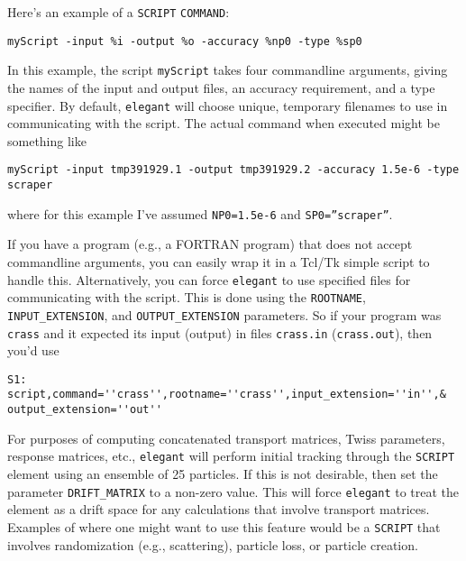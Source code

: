 Here's an example of a {\tt SCRIPT} {\tt COMMAND}:
\begin{flushleft}
\begin{verbatim}
myScript -input %i -output %o -accuracy %np0 -type %sp0
\end{verbatim}
\end{flushleft}
In this example, the script {\tt myScript} takes four commandline arguments, giving
the names of the input and output files, an accuracy requirement, and a type specifier.
By default, {\tt elegant} will choose unique, temporary filenames to use in communicating
with the script.  The actual command when executed might be something like
\begin{flushleft}
\begin{verbatim}
myScript -input tmp391929.1 -output tmp391929.2 -accuracy 1.5e-6 -type scraper
\end{verbatim}
\end{flushleft}
where for this example I've assumed {\tt NP0=1.5e-6} and {\tt SP0=''scraper''}.

If you have a program (e.g., a FORTRAN program) that does not accept
commandline arguments, you can easily wrap it in a Tcl/Tk simple script to
handle this.  Alternatively, you can force {\tt elegant} to use specified 
files for communicating with the script.  This is done using the {\tt ROOTNAME},
{\tt INPUT\_EXTENSION}, and {\tt OUTPUT\_EXTENSION} parameters.
So if your program was {\tt crass} and it expected its input (output) in files
{\tt crass.in} ({\tt crass.out}), then you'd use
\begin{flushleft}
\begin{verbatim}
S1: script,command=''crass'',rootname=''crass'',input_extension=''in'',&
output_extension=''out''
\end{verbatim}
\end{flushleft}

For purposes of computing concatenated transport matrices, Twiss
parameters, response matrices, etc., {\tt elegant} will perform
initial tracking through the \verb|SCRIPT| element using an ensemble
of 25 particles.  If this is not desirable, then set the parameter
\verb|DRIFT_MATRIX| to a non-zero value.  This will force
\verb|elegant| to treat the element as a drift space for any
calculations that involve transport matrices.  Examples of where one
might want to use this feature would be a \verb|SCRIPT| that involves
randomization (e.g., scattering), particle loss, or particle creation.

